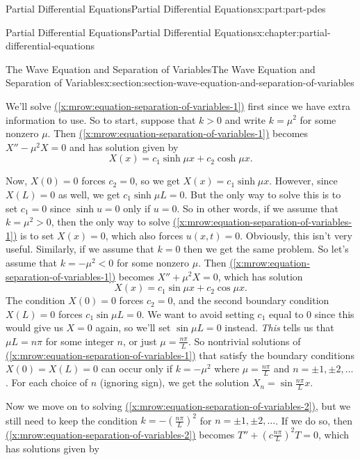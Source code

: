 \documentclass[oneside,10pt,]{book}
\newcommand{\xreffont}{\relax}
\numberwithin{equation}{part}
\newcommand{\lt}{<}
\newcommand{\gt}{>}
\begin{document}
\begin{partptx}{Partial Differential Equations}{}{Partial Differential Equations}{}{}{x:part:part-pdes}
\begin{chapterptx}{Partial Differential Equations}{}{Partial Differential Equations}{}{}{x:chapter:partial-differential-equations}
\begin{sectionptx}{The Wave Equation and Separation of Variables}{}{The Wave Equation and Separation of Variables}{}{}{x:section:section-wave-equation-and-separation-of-variables}
\par
We'll solve \hyperref[x:mrow:equation-separation-of-variables-1]{({\xreffont\ref{x:mrow:equation-separation-of-variables-1}})} first since we have extra information to use. So to start, suppose that \(k>0\) and write \(k = \mu^{2}\) for some nonzero \(\mu\). Then \hyperref[x:mrow:equation-separation-of-variables-1]{({\xreffont\ref{x:mrow:equation-separation-of-variables-1}})} becomes \(X''-\mu^{2}X = 0\) and has solution given by%
\begin{equation*}
X(x) = c_{1}\sinh\mu x + c_{2}\cosh \mu x.
\end{equation*}
%
\par
Now, \(X(0)=0\) forces \(c_{2} = 0\), so we get \(X(x) = c_{1}\sinh\mu x\). However, since \(X(L) = 0\) as well, we get \(c_{1}\sinh\mu L = 0\). But the only way to solve this is to set \(c_{1} = 0\) since \(\sinh u = 0\) only if \(u=0\). So in other words, if we assume that \(k = \mu^{2}\gt0\), then the only way to solve \hyperref[x:mrow:equation-separation-of-variables-1]{({\xreffont\ref{x:mrow:equation-separation-of-variables-1}})} is to set \(X(x) = 0\), which also forces \(u(x,t) = 0\). Obviously, this isn't very useful. Similarly, if we assume that \(k=0\) then we get the same problem. So let's assume that \(k=-\mu^{2}\lt0\) for some nonzero \(\mu\). Then \hyperref[x:mrow:equation-separation-of-variables-1]{({\xreffont\ref{x:mrow:equation-separation-of-variables-1}})} becomes \(X''+\mu^{2}X = 0\), which has solution%
%
\begin{equation*}
X(x) = c_{1}\sin\mu x + c_{2}\cos \mu x.
\end{equation*}
The condition \(X(0) = 0\) forces \(c_{2} = 0\), and the second boundary condition \(X(L) = 0\) forces \(c_{1}\sin \mu L = 0\). We want to avoid setting \(c_{1}\) equal to \(0\) since this would give us \(X=0\) again, so we'll set \(\sin \mu L= 0\) instead. \emph{This} tells us that \(\mu L = n\pi\) for some integer \(n\), or just \(\mu = \frac{n\pi}{L}\). So nontrivial solutions of \hyperref[x:mrow:equation-separation-of-variables-1]{({\xreffont\ref{x:mrow:equation-separation-of-variables-1}})} that satisfy the boundary conditions \(X(0)=X(L) = 0\) can occur only if \(k = -\mu^{2}\) where \(\mu = \frac{n\pi}{L}\) and \(n=\pm1,\pm2,\ldots\). For each choice of \(n\) (ignoring sign), we get the solution \(X_{n} = \sin\frac{n\pi}{L}x\).%
\par
Now we move on to solving \hyperref[x:mrow:equation-separation-of-variables-2]{({\xreffont\ref{x:mrow:equation-separation-of-variables-2}})}, but we still need to keep the condition \(k=-(\frac{n\pi}{L})^{2}\) for \(n=\pm1,\pm2,\ldots\). If we do so, then \hyperref[x:mrow:equation-separation-of-variables-2]{({\xreffont\ref{x:mrow:equation-separation-of-variables-2}})} becomes \(T''+(c\frac{n\pi}{L})^{2}T=0\), which has solutions given by%

\end{sectionptx}
\end{chapterptx}
\end{partptx}
\end{document}
